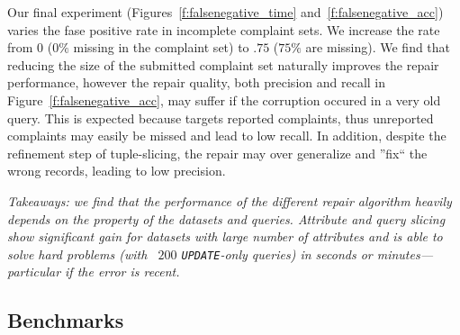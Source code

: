 Our final experiment (Figures~\ref{f:falsenegative_time} and~\ref{f:falsenegative_acc}) varies the fase positive rate in incomplete complaint sets.
We increase the rate from $0$ ($0\%$ missing in the complaint set) to $.75$ ($75\%$ are missing).  
We find that reducing the size of the submitted complaint set naturally improves the repair performance,
however the repair quality, both precision and recall in Figure~\ref{f:falsenegative_acc}, may suffer if the corruption occured in a very old query. 
This is expected because \sys targets reported complaints, thus unreported complaints may easily be missed and lead to low recall.
In addition, despite the refinement step of tuple-slicing, the repair may over generalize and ''fix`` the wrong records, leading to low precision.


% 

\smallskip

\textit{Takeaways: we find that the performance of the different repair algorithm 
heavily depends on the property of the datasets and queries. Attribute and query slicing show significant gain for 
datasets with large number of attributes and \sys is able to solve hard problems
(with ~$200$ \texttt{UPDATE}-only queries) in seconds or minutes---particular if the error is recent. }













\subsection{Benchmarks}
\label{sec:experiments:benchmark}

